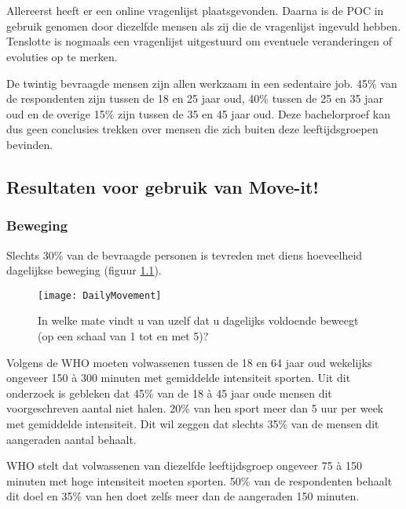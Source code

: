 \chapter{}%
\label{ch:analyse}

Allereerst heeft er een online vragenlijst plaatsgevonden. Daarna is de POC in gebruik genomen door diezelfde mensen als zij die de vragenlijst ingevuld hebben. Tenslotte is nogmaals een vragenlijst uitgestuurd om eventuele veranderingen of evoluties op te merken.

De twintig bevraagde mensen zijn allen werkzaam in een sedentaire job. 45\% van de respondenten zijn tussen de 18 en 25 jaar oud, 40\% tussen de 25 en 35 jaar oud en de overige 15\% zijn tussen de 35 en 45 jaar oud. Deze bachelorproef kan dus geen conclusies trekken over mensen die zich buiten deze leeftijdsgroepen bevinden.

\section{Resultaten voor gebruik van Move-it!}

\subsection{Beweging}
Slechts 30\% van de bevraagde personen is tevreden met diens hoeveelheid dagelijkse beweging (figuur \ref{fig:dagelijkseBeweging}).

\begin{figure}[h]
    \caption[In welke mate vindt u van uzelf dat u dagelijks voldoende beweegt (op een schaal van 1 tot en met 5)?]{In welke mate vindt u van uzelf dat u dagelijks voldoende beweegt (op een schaal van 1 tot en met 5)?}
    \texttt{[image: DailyMovement]}
    \label{fig:dagelijkseBeweging}
\end{figure}

Volgens de WHO moeten volwassenen tussen de 18 en 64 jaar oud wekelijks ongeveer 150 à 300 minuten met gemiddelde intensiteit sporten. %
Uit dit onderzoek is gebleken dat 45\% van de 18 à 45 jaar oude mensen dit voorgeschreven aantal niet halen. 20\% van hen sport meer dan 5 uur per week met gemiddelde intensiteit. Dit wil zeggen dat slechts 35\% van de mensen dit aangeraden aantal behaalt.

WHO stelt dat volwassenen van diezelfde leeftijdsgroep ongeveer 75 à 150 minuten met hoge intensiteit moeten sporten. %
50\% van de respondenten behaalt dit doel en 35\% van hen doet zelfs meer dan de aangeraden 150 minuten.

